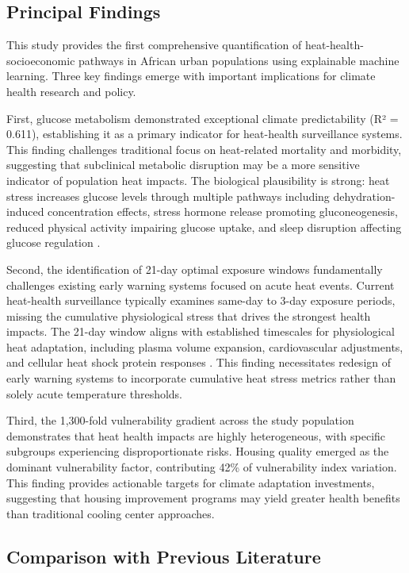 \documentclass[journal,article,submit,pdftex,moreauthors]{Definitions/mdpi}
\begin{document}
\subsection{Principal Findings}

This study provides the first comprehensive quantification of heat-health-socioeconomic pathways in African urban populations using explainable machine learning. Three key findings emerge with important implications for climate health research and policy.

First, glucose metabolism demonstrated exceptional climate predictability (R² = 0.611), establishing it as a primary indicator for heat-health surveillance systems. This finding challenges traditional focus on heat-related mortality and morbidity, suggesting that subclinical metabolic disruption may be a more sensitive indicator of population heat impacts. The biological plausibility is strong: heat stress increases glucose levels through multiple pathways including dehydration-induced concentration effects, stress hormone release promoting gluconeogenesis, reduced physical activity impairing glucose uptake, and sleep disruption affecting glucose regulation \cite{kenny2010heat,yokoyama2014glucose}.

Second, the identification of 21-day optimal exposure windows fundamentally challenges existing early warning systems focused on acute heat events. Current heat-health surveillance typically examines same-day to 3-day exposure periods, missing the cumulative physiological stress that drives the strongest health impacts. The 21-day window aligns with established timescales for physiological heat adaptation, including plasma volume expansion, cardiovascular adjustments, and cellular heat shock protein responses \cite{tyler2016heat}. This finding necessitates redesign of early warning systems to incorporate cumulative heat stress metrics rather than solely acute temperature thresholds.

Third, the 1,300-fold vulnerability gradient across the study population demonstrates that heat health impacts are highly heterogeneous, with specific subgroups experiencing disproportionate risks. Housing quality emerged as the dominant vulnerability factor, contributing 42\% of vulnerability index variation. This finding provides actionable targets for climate adaptation investments, suggesting that housing improvement programs may yield greater health benefits than traditional cooling center approaches.

\subsection{Comparison with Previous Literature}
\end{document}
